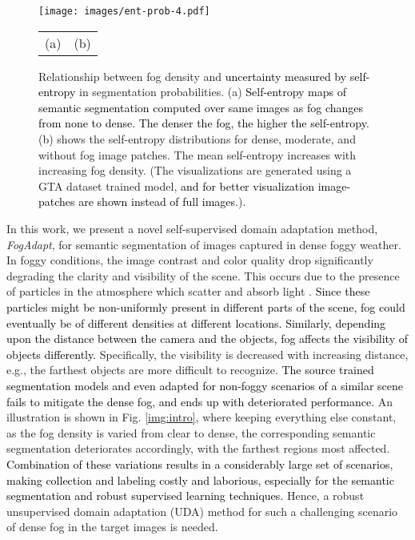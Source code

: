 \documentclass[final,5p,times,twocolumn]{elsarticle}
\begin{document}
\begin{figure*}[t]
 	\centering
 	\texttt{[image: images/ent-prob-4.pdf]}
\begin{tabular}{P{5.0cm}P{6.0cm}}
    (a) & (b) 
    \end{tabular}
 	\scriptsize
 	\caption{Relationship between fog density and \textcolor{black}{uncertainty measured by self-entropy} in segmentation probabilities. (a) \textcolor{black}{Self-entropy maps of semantic segmentation computed over same images as fog changes from none to dense. The denser the fog, the higher the self-entropy.}
 	(b) shows the self-entropy distributions for dense, moderate, and without fog image patches. The mean self-entropy increases with increasing fog density. (The visualizations are generated using a GTA dataset trained model, \textcolor{black}{and for better visualization image-patches are shown instead of full images}.).}
 	\label{img:ent-prob}
\end{figure*}


In this work, we present a novel self-supervised domain adaptation method, \textit{FogAdapt}, for semantic segmentation of images captured in dense foggy weather. 
In foggy conditions, the image contrast and color quality drop significantly degrading the clarity and visibility of the scene. 
This occurs due to the presence of particles in the atmosphere which scatter and absorb light \cite{tan2008visibility, narasimhan2003contrast}. 
\textcolor{black}{Since these particles might be non-uniformly present in different parts of the scene, fog could eventually be of different densities at different locations. Similarly, depending upon the distance between the camera and the objects, fog affects the visibility of objects differently.} 
Specifically, the visibility is decreased with increasing distance, e.g., the farthest objects are more difficult to recognize. 
\textcolor{black}{The source trained segmentation models and even adapted for non-foggy scenarios of a similar scene \cite{wu2019Resnet38,mlsl2020} fails  to mitigate the dense fog, and ends up with deteriorated performance. }
An illustration is shown in  Fig. \ref{img:intro}, where keeping everything else constant, as the fog density is varied from clear to dense, the corresponding semantic segmentation deteriorates accordingly, with the farthest regions most affected.
\textcolor{black}{Combination of these variations results in a considerably large set of scenarios, making collection and labeling costly and laborious, especially for the semantic segmentation and robust supervised learning techniques.}
Hence, a robust unsupervised domain adaptation (UDA) method for such a challenging scenario of dense fog in the target images is needed.
\end{document}
